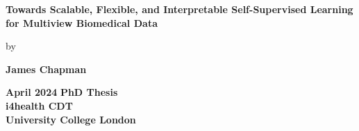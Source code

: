 \documentclass{report} %
\author{James Chapman}
\numberwithin{figure}{chapter}
\numberwithin{table}{section}
\begin{document}
\begin{titlepage}
    \centering
    {\LARGE\textbf{Towards Scalable, Flexible, and Interpretable Self-Supervised Learning for Multiview Biomedical Data}}
    \vspace{0.8cm}

    by

    \vspace{0.8cm}

    {\LARGE\textbf{James Chapman}}

    \vspace{1.5cm}

    {\LARGE\textbf{April 2024}}
    \vfill
    \textbf{
        PhD Thesis\\
        \vspace{1cm}
        i4health CDT\\
        University College London}
    \vspace{2cm}
\end{titlepage}

\onehalfspacing

\newpage



\newpage

\newpage
\dominitoc  %
\tableofcontents  %
\setcounter{tocdepth}{2}

\newpage
\listoffigures  %
\newpage
\listoftables  %

\newpage
\printglossary[type=\acronymtype, title=Acronyms]  %
\newpage
\printglossary[type=symbols, title=Symbols List]  %
\glsaddallunused[symbols]
\newpage
\printglossary[type=main, title=Definitions]  %
\glsaddallunused[main]
\end{document}

